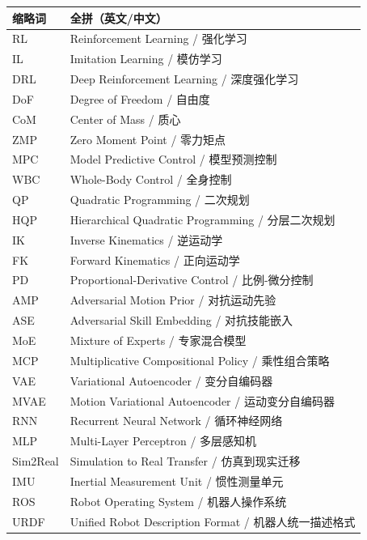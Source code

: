 \noindent
\renewcommand{\arraystretch}{1.3}
\begin{tabular*}{\textwidth}{@{\extracolsep{\fill}}ll}
	\toprule
	缩略词 & 全拼（英文/中文） \\
	\midrule
	
	RL & Reinforcement Learning / 强化学习 \\
	IL & Imitation Learning / 模仿学习 \\
	DRL & Deep Reinforcement Learning / 深度强化学习 \\
	DoF & Degree of Freedom / 自由度 \\
	CoM & Center of Mass / 质心 \\
	ZMP & Zero Moment Point / 零力矩点 \\
	MPC & Model Predictive Control / 模型预测控制 \\
	WBC & Whole-Body Control / 全身控制 \\
	QP & Quadratic Programming / 二次规划 \\
	HQP & Hierarchical Quadratic Programming / 分层二次规划 \\
	IK & Inverse Kinematics / 逆运动学 \\
	FK & Forward Kinematics / 正向运动学 \\
	PD & Proportional-Derivative Control / 比例-微分控制 \\
	AMP & Adversarial Motion Prior / 对抗运动先验 \\
	ASE & Adversarial Skill Embedding / 对抗技能嵌入 \\
	MoE & Mixture of Experts / 专家混合模型 \\
	MCP & Multiplicative Compositional Policy / 乘性组合策略 \\
	VAE & Variational Autoencoder / 变分自编码器 \\
	MVAE & Motion Variational Autoencoder / 运动变分自编码器 \\
	RNN & Recurrent Neural Network / 循环神经网络 \\
	MLP & Multi-Layer Perceptron / 多层感知机 \\
	Sim2Real & Simulation to Real Transfer / 仿真到现实迁移 \\
	IMU & Inertial Measurement Unit / 惯性测量单元 \\
	ROS & Robot Operating System / 机器人操作系统 \\
	URDF & Unified Robot Description Format / 机器人统一描述格式 \\
	
	\bottomrule
\end{tabular*}